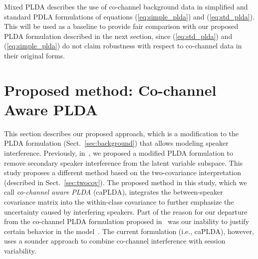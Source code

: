 Mixed PLDA describes the use of co-channel background data in simplified and standard PDLA formulations of equations (\ref{eq:simple_plda}) and (\ref{eq:std_plda}). 
This will be used as a baseline to provide fair comparison with our proposed PLDA formulation described in the next section, since (\ref{eq:std_plda}) and (\ref{eq:simple_plda}) do not claim robustness with respect to co-channel data in their original forms. 


\section{Proposed method: Co-channel Aware PLDA}
\label{sec:cch_plda}
This section describes our proposed approach, which is a modification to the PLDA formulation (Sect.~\ref{sec:background}) that allows modeling speaker interference. 
Previously, in~\cite{shokouhi2015probabilistic}, we proposed a modified PLDA formulation to remove secondary speaker interference from the latent variable subspace. 
This study proposes a different method based on the two-covariance interpretation (described in Sect.~\ref{sec:twocov}). 
The proposed method in this study, which we call {\it co-channel aware PLDA} (caPLDA), integrates the between-speaker covariance matrix into the within-class covariance to further emphasize the uncertainty caused by interfering speakers. 
Part of the reason for our departure from the co-channel PLDA formulation proposed in~\cite{shokouhi2015probabilistic} was our inability to justify certain behavior in the model~\cite{navid_phd_thesis}. 
The current formulation (i.e., caPLDA), however, uses a sounder approach to combine co-channel interference with session variability. 

